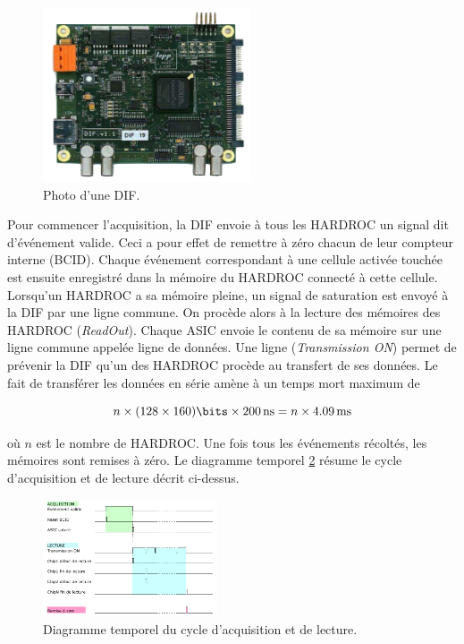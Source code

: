 \begin{figure}[ht!]
	\centering
	\includegraphics[width=0.55\textwidth]{GLA/DIF.png}
	\captionsetup{type=figure}\caption{Photo d'une DIF.}
	\label{DIF}
\end{figure}

Pour commencer l'acquisition, la DIF envoie à tous les HARDROC un signal dit d'événement valide. Ceci a pour effet de remettre à zéro chacun de leur compteur interne (BCID). Chaque événement correspondant à une cellule activée touchée est ensuite enregistré dans la mémoire du HARDROC connecté à cette cellule. Lorsqu'un HARDROC a sa mémoire pleine, un signal de saturation est envoyé à la DIF par une ligne commune. On procède alors à la lecture des mémoires des HARDROC (\textit{ReadOut}). Chaque ASIC envoie le contenu de sa mémoire sur une ligne commune appelée ligne de données. Une ligne (\textit{Transmission ON}) permet de prévenir la DIF qu'un des HARDROC procède au transfert de ses données. Le fait de transférer les données en série amène à un temps mort maximum de

\begin{equation}
n\times(128 \times 160)\si{\bits}\times \SI{200}{\nano\second}= n\times\SI{4.09}{\milli\second}
\end{equation} 

où $n$ est le nombre de HARDROC. Une fois tous les événements récoltés, les mémoires sont remises à zéro. Le diagramme temporel \ref{temp} résume le cycle d'acquisition et de lecture décrit ci-dessus.

\begin{figure}[ht!]
	\centering
	\includegraphics[width=0.46\textwidth]{GLA/cycle.png}
	\captionsetup{type=figure}\caption{Diagramme temporel du cycle d'acquisition et de lecture.}
	\label{temp}
\end{figure}

